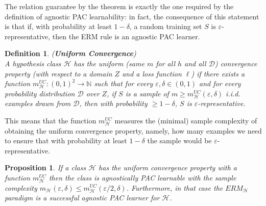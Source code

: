 \documentclass[12pt]{report}
\theoremstyle{plain}
\newtheorem{definition}{Definition}[chapter]
\newtheorem{proposition}{Proposition}[chapter]
\newcommand\mcl[1]{\mathcal{#1}}
\begin{document}
\begin{flushleft}
The relation guarantee by the theorem is exactly the one required by the definition of agnostic PAC learnability: in fact, the consequence of this statement is that if, with probability at least $1-\delta$, a random training set $S$ is $\varepsilon$-representative, then the ERM rule is an agnostic PAC learner.

\begin{definition} (\textbf{Uniform Convergence})\\
	A hypothesis class $\mcl{H}$ has the uniform (same $m$ for all $h$ and all $\mcl{D}$) convergence property (with respect to a domain $Z$ and a loss function $\ell$) if there exists a function $m_\mcl{H}^{UC}:(0,1)^2\to\mathds{N}$ such that for every $\varepsilon,\delta\in(0,1)$ and for every probability distribution $\mcl{D}$ over $Z$, if $S$ is a sample of $m\geq m_\mcl{H}^{UC}(\varepsilon,\delta)$ i.i.d. examples drawn from $\mcl{D}$, then with probability $\geq 1-\delta$, $S$ is $\varepsilon$-representative.
\end{definition} 

This means that the function $m_\mcl{H}^{UC}$ measures the (minimal) sample complexity of obtaining the uniform convergence property, namely, how many examples we need to ensure that with probability at least $1-\delta$ the sample would be $\varepsilon$-representative.

\begin{proposition}
	If a class $\mcl{H}$ has the uniform convergence property with a function $m_\mcl{H}^{UC}$ then the class is agnostically PAC learnable with the sample complexity $m_\mcl{H}(\varepsilon,\delta)\leq m_\mcl{H}^{UC}(\varepsilon/2,\delta)$. Furthermore, in that case the $ERM_\mcl{H}$ paradigm is a successful agnostic PAC learner for $\mcl{H}$.	
\end{proposition}


\end{flushleft}
\end{document}

